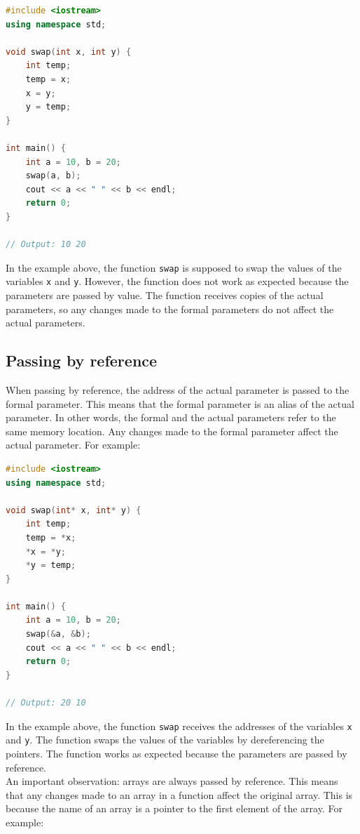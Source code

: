 \begin{lstlisting}[language=C++]
#include <iostream>
using namespace std;

void swap(int x, int y) {
    int temp;
    temp = x;
    x = y;
    y = temp;
}

int main() {
    int a = 10, b = 20;
    swap(a, b);
    cout << a << " " << b << endl;
    return 0;
}

// Output: 10 20
\end{lstlisting}

In the example above, the function \texttt{swap} is supposed to swap the values
of the variables \texttt{x} and \texttt{y}. However, the function does not work
as expected because the parameters are passed by value. The function receives
copies of the actual parameters, so any changes made to the formal parameters do
not affect the actual parameters.

\subsection{Passing by reference}

When passing by reference, the address of the actual parameter is passed to the
formal parameter. This means that the formal parameter is an alias of the actual
parameter. In other words, the formal and the actual parameters refer to the same
memory location. Any changes made to the formal parameter affect the actual
parameter. For example:\\

\begin{lstlisting}[language=C++]
#include <iostream>
using namespace std;

void swap(int* x, int* y) {
    int temp;
    temp = *x;
    *x = *y;
    *y = temp;
}

int main() {
    int a = 10, b = 20;
    swap(&a, &b);
    cout << a << " " << b << endl;
    return 0;
}

// Output: 20 10
\end{lstlisting}

In the example above, the function \texttt{swap} receives the addresses of the
variables \texttt{x} and \texttt{y}. The function swaps the values of the
variables by dereferencing the pointers. The function works as expected because
the parameters are passed by reference.\\

An important observation: arrays are always passed by reference. This means that
any changes made to an array in a function affect the original array. This is 
because the name of an array is a pointer to the first element of the array. For
example:\\

